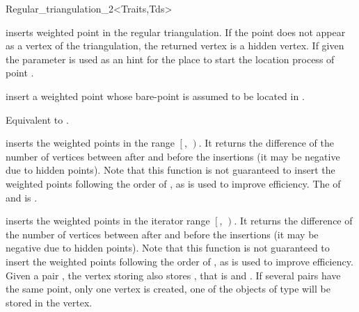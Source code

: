 \begin{ccRefClass}{Regular_triangulation_2<Traits,Tds>}


{inserts  weighted point  in the regular triangulation.
If the point   does not appear as a vertex of the triangulation,
the returned vertex is  a hidden vertex.
If given the parameter  is used as an hint
for the place to start the location process of point .}


{insert a weighted point  whose bare-point is assumed to be
located in  .}

{Equivalent to .}

{inserts the weighted points in the range
 $\left[\right.$, $\left.\right)$.
 It returns the difference of the number of vertices between after and
 before the insertions (it may be negative due to hidden points).
 Note that this function is not guaranteed to insert the weighted points
 following the order of , as 
 is used to improve efficiency.
 \ccPrecond The  of  and 
 is .}

{
inserts the weighted points in the iterator range $\left[\right.$,
$\left.\right)$.  
It returns the difference of the number of vertices between after and
before the insertions (it may be negative due to hidden points).
Note that this function is not guaranteed to insert the weighted points
following the order of , as 
is used to improve efficiency.
Given a pair ,  the vertex  storing  also stores , that is 
 and . If several pairs have the same point, 
only one vertex is created, one of the objects of type  will be stored in the vertex.
}


\end{ccRefClass}
